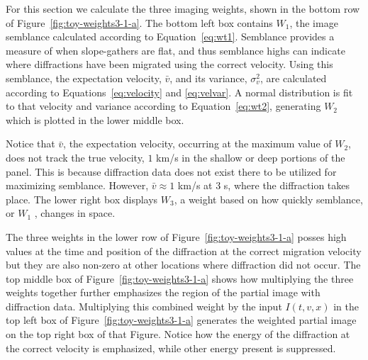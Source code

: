 For this section we calculate the three imaging weights, shown in the bottom row of Figure~\ref{fig:toy-weights3-1-a}.  The bottom left box contains $W_1$, the image semblance calculated according to Equation~\ref{eq:wt1}.  Semblance provides a measure of when slope-gathers are flat, and thus semblance highs can indicate where diffractions have been migrated using the correct velocity.  Using this semblance, the expectation velocity, $\bar{v}$, and its variance, $\sigma^2_v$, are calculated according to Equations~\ref{eq:velocity} and \ref{eq:velvar}. A normal distribution is fit to that velocity and variance according to Equation~\ref{eq:wt2}, generating $W_2$ which is plotted in the lower middle box. 
 
Notice that $\bar{v}$, the expectation velocity, occurring at the maximum value of $W_2$, does not track the true velocity, $1$ km/s in the shallow or deep portions of the panel.  This is because diffraction data does not exist there to be utilized for maximizing semblance.  However, $\bar{v} \approx 1$ km/s at 3 s, where the diffraction takes place.  The lower right box displays $W_3$, a weight based on how quickly semblance, or $W_1$ , changes in space.  

The three weights in the lower row of Figure~\ref{fig:toy-weights3-1-a} posses high values at the time and position of the diffraction at the correct migration velocity but they are also non-zero at other locations where diffraction did not occur.  The top middle box of Figure~\ref{fig:toy-weights3-1-a} shows how multiplying the three weights together further emphasizes the region of the partial image with diffraction data.  Multiplying this combined weight by the input $I(t,v,x)$ in the top left box of Figure~\ref{fig:toy-weights3-1-a} generates the weighted partial image on the top right box of that Figure.  Notice how the energy of the diffraction at the correct velocity is emphasized, while other energy present is suppressed. 



